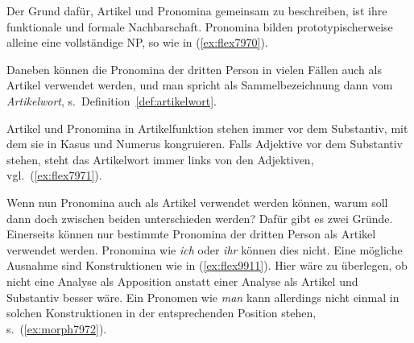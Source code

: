 Der Grund dafür, Artikel und Pronomina gemeinsam zu beschreiben, ist ihre funktionale und formale Nachbarschaft.
Pronomina bilden prototypischerweise alleine eine vollständige NP, so wie in (\ref{ex:flex7970}).

\begin{exe}
  \ex \label{ex:flex7970}
  \begin{xlist}
  \end{xlist}
\end{exe}

Daneben können die Pronomina der dritten Person in vielen Fällen auch als Artikel verwendet werden, und man spricht als Sammelbezeichnung dann vom \textit{Artikelwort}, s.\ Definition~\ref{def:artikelwort}.


Artikel und Pronomina in Artikelfunktion stehen immer vor dem Substantiv, mit dem sie in Kasus und Numerus kongruieren.
Falls Adjektive vor dem Substantiv stehen, steht das Artikelwort immer links von den Adjektiven, vgl.\ (\ref{ex:flex7971}).

\begin{exe}
  \ex \label{ex:flex7971}
  \begin{xlist}
  \end{xlist}
\end{exe}



Wenn nun Pronomina auch als Artikel verwendet werden können, warum soll dann doch zwischen beiden unterschieden werden?
Dafür gibt es zwei Gründe.
Einerseits können nur bestimmte Pronomina der dritten Person als Artikel verwendet werden.
Pronomina wie \textit{ich} oder \textit{ihr} können dies \zB nicht.
Eine mögliche Ausnahme sind Konstruktionen wie in (\ref{ex:flex9911}).
Hier wäre zu überlegen, ob nicht eine Analyse als Apposition anstatt einer Analyse als Artikel und Substantiv besser wäre.
Ein Pronomen wie \textit{man} kann allerdings nicht einmal in solchen Konstruktionen in der entsprechenden Position stehen, s.\ (\ref{ex:morph7972}).

